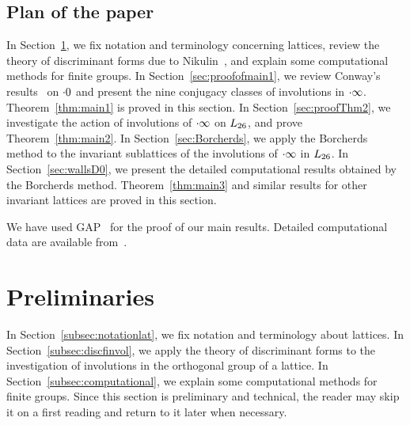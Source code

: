 \documentclass{amsart} %
\begin{document}
\subsection{Plan of the paper}\label{subsec:plan}
%
In Section~\ref{sec:prelim},
we fix notation and terminology concerning lattices, 
review the theory of discriminant forms
due to Nikulin~\cite{MR525944}, 
and explain some computational methods 
for finite groups.
In Section~\ref{sec:proofofmain1},
we review Conway's results~\cite[Chapter 10]{theCSbook} on $\cdot 0$
and present the nine conjugacy classes of involutions in $\cdot \infty$.
Theorem~\ref{thm:main1} is proved in this section.
In Section~\ref{sec:proofThm2},
we investigate the action of involutions of $\cdot \infty$ on $L_{26}$,
and prove Theorem~\ref{thm:main2}.
In Section~\ref{sec:Borcherds},
we apply the Borcherds method to the invariant sublattices of the involutions 
of $\cdot \infty$ in $L_{26}$.
In Section~\ref{sec:wallsD0},
we present the detailed computational results obtained by
 the Borcherds method.
 Theorem~\ref{thm:main3} and similar results for other invariant lattices are proved in this section.
%
\par
We have used GAP~\cite{GAP4} 
for the proof of our main results.
Detailed computational data are available from~\cite{affConwayCompdata}.
%
\section{Preliminaries}\label{sec:prelim}
%
In Section~\ref{subsec:notationlat}, 
we fix notation and terminology about lattices.
In Section~\ref{subsec:discfinvol},
we apply the theory of discriminant forms
to the investigation of involutions in the orthogonal group of a lattice.
In Section~\ref{subsec:computational},
we explain some computational methods 
for finite groups.
Since this section is preliminary and technical, the reader may skip it on a first reading and return to it later when necessary.
%
%
\end{document}
